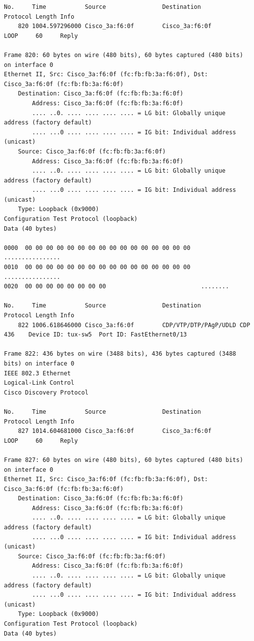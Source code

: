 \documentclass[a4paper,11pt]{article}
\begin{document}
\begin{lstlisting}
No.     Time           Source                Destination           Protocol Length Info
    820 1004.597296000 Cisco_3a:f6:0f        Cisco_3a:f6:0f        LOOP     60     Reply

Frame 820: 60 bytes on wire (480 bits), 60 bytes captured (480 bits) on interface 0
Ethernet II, Src: Cisco_3a:f6:0f (fc:fb:fb:3a:f6:0f), Dst: Cisco_3a:f6:0f (fc:fb:fb:3a:f6:0f)
    Destination: Cisco_3a:f6:0f (fc:fb:fb:3a:f6:0f)
        Address: Cisco_3a:f6:0f (fc:fb:fb:3a:f6:0f)
        .... ..0. .... .... .... .... = LG bit: Globally unique address (factory default)
        .... ...0 .... .... .... .... = IG bit: Individual address (unicast)
    Source: Cisco_3a:f6:0f (fc:fb:fb:3a:f6:0f)
        Address: Cisco_3a:f6:0f (fc:fb:fb:3a:f6:0f)
        .... ..0. .... .... .... .... = LG bit: Globally unique address (factory default)
        .... ...0 .... .... .... .... = IG bit: Individual address (unicast)
    Type: Loopback (0x9000)
Configuration Test Protocol (loopback)
Data (40 bytes)

0000  00 00 00 00 00 00 00 00 00 00 00 00 00 00 00 00   ................
0010  00 00 00 00 00 00 00 00 00 00 00 00 00 00 00 00   ................
0020  00 00 00 00 00 00 00 00                           ........

No.     Time           Source                Destination           Protocol Length Info
    822 1006.618646000 Cisco_3a:f6:0f        CDP/VTP/DTP/PAgP/UDLD CDP      436    Device ID: tux-sw5  Port ID: FastEthernet0/13  

Frame 822: 436 bytes on wire (3488 bits), 436 bytes captured (3488 bits) on interface 0
IEEE 802.3 Ethernet 
Logical-Link Control
Cisco Discovery Protocol

No.     Time           Source                Destination           Protocol Length Info
    827 1014.604681000 Cisco_3a:f6:0f        Cisco_3a:f6:0f        LOOP     60     Reply

Frame 827: 60 bytes on wire (480 bits), 60 bytes captured (480 bits) on interface 0
Ethernet II, Src: Cisco_3a:f6:0f (fc:fb:fb:3a:f6:0f), Dst: Cisco_3a:f6:0f (fc:fb:fb:3a:f6:0f)
    Destination: Cisco_3a:f6:0f (fc:fb:fb:3a:f6:0f)
        Address: Cisco_3a:f6:0f (fc:fb:fb:3a:f6:0f)
        .... ..0. .... .... .... .... = LG bit: Globally unique address (factory default)
        .... ...0 .... .... .... .... = IG bit: Individual address (unicast)
    Source: Cisco_3a:f6:0f (fc:fb:fb:3a:f6:0f)
        Address: Cisco_3a:f6:0f (fc:fb:fb:3a:f6:0f)
        .... ..0. .... .... .... .... = LG bit: Globally unique address (factory default)
        .... ...0 .... .... .... .... = IG bit: Individual address (unicast)
    Type: Loopback (0x9000)
Configuration Test Protocol (loopback)
Data (40 bytes)


\end{lstlisting}
\end{document}
